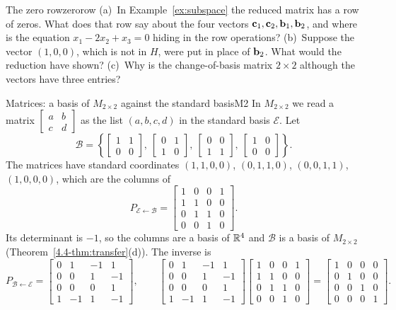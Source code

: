 \documentclass[11pt]{article}
\begin{document}
\begin{think}{The zero row}{zerorow}
(a)~In Example~\ref{ex:subspace} the reduced matrix has a row of zeros. What does that row say about the four vectors $\mathbf{c}_1,\mathbf{c}_2,\mathbf{b}_1,\mathbf{b}_2$, and where is the equation $x_1-2x_2+x_3=0$ hiding in the row operations? (b)~Suppose the vector $(1,0,0)$, which is not in $H$, were put in place of $\mathbf{b}_2$. What would the reduction have shown? (c)~Why is the change-of-basis matrix $2\times2$ although the vectors have three entries?
\end{think}

\begin{exmp}{Matrices: a basis of $M_{2\times2}$ against the standard basis}{M2}
In $M_{2\times2}$ we read a matrix $\begin{bmatrix}a&b\\c&d\end{bmatrix}$ as the list $(a,b,c,d)$ in the standard basis $\mathcal{E}$. Let
\[
\mathcal{B}=\left\{\begin{bmatrix}1&1\\0&0\end{bmatrix},\ \begin{bmatrix}0&1\\1&0\end{bmatrix},\ \begin{bmatrix}0&0\\1&1\end{bmatrix},\ \begin{bmatrix}1&0\\0&0\end{bmatrix}\right\}.
\]
The matrices have standard coordinates $(1,1,0,0)$, $(0,1,1,0)$, $(0,0,1,1)$, $(1,0,0,0)$, which are the columns of
\[
P_{\mathcal{E}\leftarrow\mathcal{B}}=\begin{bmatrix}1&0&0&1\\1&1&0&0\\0&1&1&0\\0&0&1&0\end{bmatrix}.
\]
Its determinant is $-1$, so the columns are a basis of $\mathbb{R}^4$ and $\mathcal{B}$ is a basis of $M_{2\times2}$ (Theorem~\ref{4.4-thm:transfer}(d)). The inverse is
\[
P_{\mathcal{B}\leftarrow\mathcal{E}}=\begin{bmatrix}0&1&-1&1\\0&0&1&-1\\0&0&0&1\\1&-1&1&-1\end{bmatrix},\qquad \begin{bmatrix}0&1&-1&1\\0&0&1&-1\\0&0&0&1\\1&-1&1&-1\end{bmatrix}\begin{bmatrix}1&0&0&1\\1&1&0&0\\0&1&1&0\\0&0&1&0\end{bmatrix}=\begin{bmatrix}1&0&0&0\\0&1&0&0\\0&0&1&0\\0&0&0&1\end{bmatrix}.
\]
\end{exmp}
\end{document}
